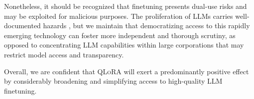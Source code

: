 Nonetheless, it should be recognized that finetuning presents dual-use risks and may be exploited for malicious purposes. The proliferation of LLMs carries well-documented hazards \citep{bommasani2021opportunities,bender2021dangers}, but we maintain that democratizing access to this rapidly emerging technology can foster more independent and thorough scrutiny, as opposed to concentrating LLM capabilities within large corporations that may restrict model access and transparency.

Overall, we are confident that \textsc{QLoRA} will exert a predominantly positive effect by considerably broadening and simplifying access to high-quality LLM finetuning.